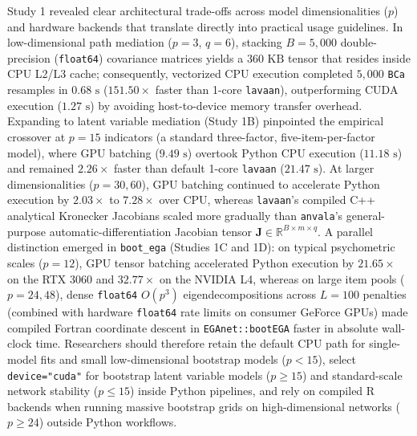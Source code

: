 ﻿\documentclass[12pt,letterpaper]{article}
\begin{document}
Study 1 revealed clear architectural trade-offs across model dimensionalities ($p$) and hardware backends that translate directly into practical usage guidelines. In low-dimensional path mediation ($p = 3$, $q = 6$), stacking $B = 5{,}000$ double-precision (\texttt{float64}) covariance matrices yields a $360\text{ KB}$ tensor that resides inside CPU L2/L3 cache; consequently, vectorized CPU execution completed $5{,}000$ \texttt{BCa} resamples in $0.68\text{ s}$ ($151.50\times$ faster than 1-core \texttt{lavaan}), outperforming CUDA execution ($1.27\text{ s}$) by avoiding host-to-device memory transfer overhead. Expanding to latent variable mediation (Study 1B) pinpointed the empirical crossover at $p = 15$ indicators (a standard three-factor, five-item-per-factor model), where GPU batching ($9.49\text{ s}$) overtook Python CPU execution ($11.18\text{ s}$) and remained $2.26\times$ faster than default 1-core \texttt{lavaan} ($21.47\text{ s}$). At larger dimensionalities ($p = 30, 60$), GPU batching continued to accelerate Python execution by $2.03\times$ to $7.28\times$ over CPU, whereas \texttt{lavaan}'s compiled C++ analytical Kronecker Jacobians scaled more gradually than \texttt{anvala}'s general-purpose automatic-differentiation Jacobian tensor $\mathbf{J} \in \mathbb{R}^{B \times m \times q}$. A parallel distinction emerged in \texttt{boot\_ega} (Studies 1C and 1D): on typical psychometric scales ($p = 12$), GPU tensor batching accelerated Python execution by $21.65\times$ on the RTX 3060 and $32.77\times$ on the NVIDIA L4, whereas on large item pools ($p = 24, 48$), dense \texttt{float64} $O(p^3)$ eigendecompositions across $L = 100$ penalties (combined with hardware \texttt{float64} rate limits on consumer GeForce GPUs) made compiled Fortran coordinate descent in \texttt{EGAnet::bootEGA} faster in absolute wall-clock time. Researchers should therefore retain the default CPU path for single-model fits and small low-dimensional bootstrap models ($p < 15$), select \texttt{device="cuda"} for bootstrap latent variable models ($p \ge 15$) and standard-scale network stability ($p \le 15$) inside Python pipelines, and rely on compiled R backends when running massive bootstrap grids on high-dimensional networks ($p \ge 24$) outside Python workflows.
\end{document}
